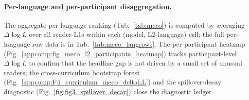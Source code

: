 \paragraph{Per-language and per-participant disaggregation.} The aggregate per-language ranking (Tab.~\ref{tab:meco}) is computed by averaging $\Delta\log L$ over all reader-L1s within each (model, L2-language) cell; the full per-language row data is in Tab.~\ref{tab:meco_langrows}. The per-participant heatmap (Fig.~\ref{appcomp:fig_meco_l2_participants_heatmap}) tracks participant-level $\Delta\log L$ to confirm that the headline gap is not driven by a small set of unusual readers; the cross-curriculum bootstrap forest (Fig.~\ref{appcomp:F4_curriculum_meco_deltaLL}) and the spillover-decay diagnostic (Fig.~\ref{fig:fig3_spillover_decay}) close the diagnostic ledger. \label{appcomp:meco}



